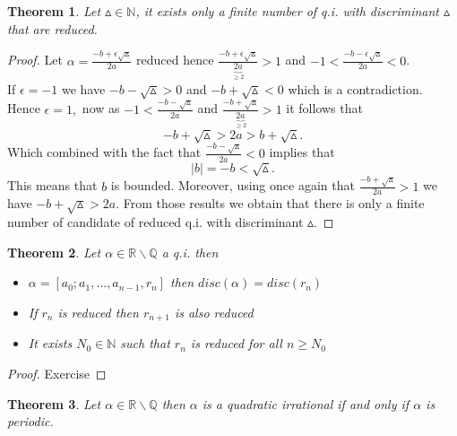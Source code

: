 \documentclass[a4paper,11pt,american]{article}
\newcommand{\N}{\mathbb{N}}
\newcommand{\Q}{\mathbb{Q}}
\newcommand{\R}{\mathbb{R}}
\theoremstyle{plain}
\newtheorem{theorem}{Theorem}
\theoremstyle{definition}
\begin{document}
 \begin{theorem}\label{thr:11}
     Let $\vartriangle\in\N$, it exists only a finite number of q.i. with discriminant $\vartriangle$ that are reduced.
     \end{theorem}
     \begin{proof}
         Let $\alpha=\frac{-b+\epsilon\sqrt{\vartriangle}}{2a}$ reduced hence $\frac{-b+\epsilon\sqrt{\vartriangle}}{\underbrace{2a}_{\geq2}}>1$ and $-1<\frac{-b-\epsilon\sqrt{\vartriangle}}{2a}<0$.\\
         If $\epsilon=-1$ we have $-b-\sqrt{\vartriangle}>0$ and $-b+\sqrt{\vartriangle}<0$ which is a contradiction.\\
         Hence $\epsilon=1,$ now as $-1<\frac{-b-\sqrt{\vartriangle}}{2a}$ and $\frac{-b+\sqrt{\vartriangle}}{\underbrace{2a}_{\geq2}}>1$ it follows that $$-b+\sqrt{\vartriangle}>2a>b+\sqrt{\vartriangle}.$$
         Which combined with the fact that $\frac{-b-\sqrt{\vartriangle}}{2a}<0$ implies that 
         $$\vert b\vert=-b<\sqrt{\vartriangle}.$$
         This means that $b$ is bounded. Moreover, using once again that $\frac{-b+\sqrt{\vartriangle}}{2a}>1$ we have $-b+\sqrt{\vartriangle}>{2a}$. From those results we obtain that there is only a finite number of candidate of reduced q.i. with discriminant $\vartriangle$.
     \end{proof}
     \begin{theorem}\label{thr:12}
         Let $\alpha\in\R\backslash\Q$ a q.i. then 
         \begin{itemize}
             \item $\alpha=[a_0;a_1,\dots,a_{n-1},r_n]$ then $disc(\alpha)=disc(r_n)$\\
             \item If $r_n$ is reduced then $r_{n+1}$ is also reduced \\
             \item It exists $N_0\in\N$ such that $r_n$ is reduced for all $n\geq N_0$
         \end{itemize}
     \end{theorem}
     \begin{proof}
         Exercise
     \end{proof}
     \begin{theorem}
         Let $\alpha\in\R\backslash \Q$ then $\alpha$ is a quadratic irrational if and only if $\alpha$ is periodic.
     \end{theorem}
\end{document}
